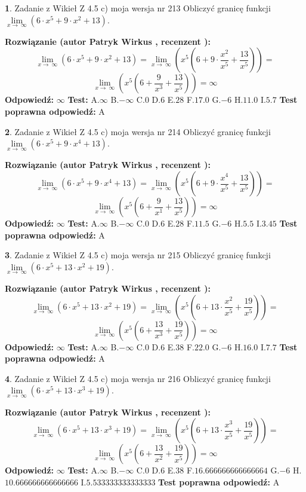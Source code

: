 \documentclass[12pt, a4paper]{article}
\theoremstyle{definition} %
\newtheorem{zad}{}
\newcommand{\zadStart}[1]{\begin{zad}#1\newline}
\newcommand{\zadStop}{\end{zad}}
\newcommand{\rozwStart}[2]{\noindent \textbf{Rozwiązanie (autor #1 , recenzent #2): }\newline}
\newcommand{\rozwStop}{\newline}
\newcommand{\odpStart}{\noindent \textbf{Odpowiedź:}\newline}
\newcommand{\odpStop}{\newline}
\newcommand{\testStart}{\noindent \textbf{Test:}\newline}
\newcommand{\testStop}{\newline}
\newcommand{\kluczStart}{\noindent \textbf{Test poprawna odpowiedź:}\newline}
\newcommand{\kluczStop}{\newline}
\begin{document}
\zadStart{Zadanie z Wikieł Z 4.5 c) moja wersja nr 213}
Obliczyć granicę funkcji  $\lim\limits_{x\to\ \infty}(6 \cdot x^{5}+9 \cdot x^{2}+13)$.
\zadStop
\rozwStart{Patryk Wirkus}{}
$$\lim\limits_{x\to\ \infty}(6 \cdot x^{5}+9 \cdot x^{2}+13) = \lim\limits_{x\to\ \infty}(x^{5}(6 +9 \cdot \frac{x^{2}}{x^{5}}+\frac{13}{x^{5}})) =$$ $$\lim\limits_{x\to\ \infty}(x^{5}(6 +\frac{9}{x^{3}}+\frac{13}{x^{5}})) =\infty$$
\rozwStop
\odpStart
$\infty$
\odpStop
\testStart
A.$\infty$ B.$-\infty$ C.$0$ D.$6$ E.$28$
F.$17.0$ G.$-6$
H.$11.0$
I.$5.7$
\testStop
\kluczStart
A
\kluczStop



\zadStart{Zadanie z Wikieł Z 4.5 c) moja wersja nr 214}
Obliczyć granicę funkcji  $\lim\limits_{x\to\ \infty}(6 \cdot x^{5}+9 \cdot x^{4}+13)$.
\zadStop
\rozwStart{Patryk Wirkus}{}
$$\lim\limits_{x\to\ \infty}(6 \cdot x^{5}+9 \cdot x^{4}+13) = \lim\limits_{x\to\ \infty}(x^{5}(6 +9 \cdot \frac{x^{4}}{x^{5}}+\frac{13}{x^{5}})) =$$ $$\lim\limits_{x\to\ \infty}(x^{5}(6 +\frac{9}{x^{1}}+\frac{13}{x^{5}})) =\infty$$
\rozwStop
\odpStart
$\infty$
\odpStop
\testStart
A.$\infty$ B.$-\infty$ C.$0$ D.$6$ E.$28$
F.$11.5$ G.$-6$
H.$5.5$
I.$3.45$
\testStop
\kluczStart
A
\kluczStop



\zadStart{Zadanie z Wikieł Z 4.5 c) moja wersja nr 215}
Obliczyć granicę funkcji  $\lim\limits_{x\to\ \infty}(6 \cdot x^{5}+13 \cdot x^{2}+19)$.
\zadStop
\rozwStart{Patryk Wirkus}{}
$$\lim\limits_{x\to\ \infty}(6 \cdot x^{5}+13 \cdot x^{2}+19) = \lim\limits_{x\to\ \infty}(x^{5}(6 +13 \cdot \frac{x^{2}}{x^{5}}+\frac{19}{x^{5}})) =$$ $$\lim\limits_{x\to\ \infty}(x^{5}(6 +\frac{13}{x^{3}}+\frac{19}{x^{5}})) =\infty$$
\rozwStop
\odpStart
$\infty$
\odpStop
\testStart
A.$\infty$ B.$-\infty$ C.$0$ D.$6$ E.$38$
F.$22.0$ G.$-6$
H.$16.0$
I.$7.7$
\testStop
\kluczStart
A
\kluczStop



\zadStart{Zadanie z Wikieł Z 4.5 c) moja wersja nr 216}
Obliczyć granicę funkcji  $\lim\limits_{x\to\ \infty}(6 \cdot x^{5}+13 \cdot x^{3}+19)$.
\zadStop
\rozwStart{Patryk Wirkus}{}
$$\lim\limits_{x\to\ \infty}(6 \cdot x^{5}+13 \cdot x^{3}+19) = \lim\limits_{x\to\ \infty}(x^{5}(6 +13 \cdot \frac{x^{3}}{x^{5}}+\frac{19}{x^{5}})) =$$ $$\lim\limits_{x\to\ \infty}(x^{5}(6 +\frac{13}{x^{2}}+\frac{19}{x^{5}})) =\infty$$
\rozwStop
\odpStart
$\infty$
\odpStop
\testStart
A.$\infty$ B.$-\infty$ C.$0$ D.$6$ E.$38$
F.$16.666666666666664$ G.$-6$
H.$10.666666666666666$
I.$5.533333333333333$
\testStop
\kluczStart
A
\kluczStop
\end{document}
